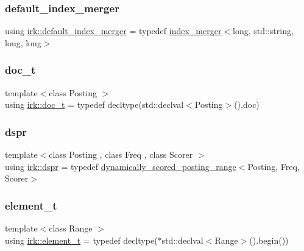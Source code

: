 \subsubsection{\texorpdfstring{default\+\_\+index\+\_\+merger}{default\_index\_merger}}
{\footnotesize\ttfamily using \mbox{\hyperlink{namespaceirk_a227068f98c83d33da43fab6a15633fb5}{irk\+::default\+\_\+index\+\_\+merger}} = typedef \mbox{\hyperlink{classirk_1_1index__merger}{index\+\_\+merger}}$<$long, std\+::string, long, long$>$}

\mbox{\label{namespaceirk_af5d95ec091f3bd711790e71ccb533903}} 
\subsubsection{\texorpdfstring{doc\+\_\+t}{doc\_t}}
{\footnotesize\ttfamily template$<$class Posting $>$ \\
using \mbox{\hyperlink{namespaceirk_af5d95ec091f3bd711790e71ccb533903}{irk\+::doc\+\_\+t}} = typedef decltype(std\+::declval$<$Posting$>$().doc)}

\mbox{\label{namespaceirk_af92c7aae439f59ccae252f027f851c24}} 
\subsubsection{\texorpdfstring{dspr}{dspr}}
{\footnotesize\ttfamily template$<$class Posting , class Freq , class Scorer $>$ \\
using \mbox{\hyperlink{namespaceirk_af92c7aae439f59ccae252f027f851c24}{irk\+::dspr}} = typedef \mbox{\hyperlink{classirk_1_1dynamically__scored__posting__range}{dynamically\+\_\+scored\+\_\+posting\+\_\+range}}$<$Posting, Freq, Scorer$>$}

\mbox{\label{namespaceirk_a44ec708d671914dae1d40355ac05c280}} 
\subsubsection{\texorpdfstring{element\+\_\+t}{element\_t}}
{\footnotesize\ttfamily template$<$class Range $>$ \\
using \mbox{\hyperlink{namespaceirk_a44ec708d671914dae1d40355ac05c280}{irk\+::element\+\_\+t}} = typedef decltype($\ast$std\+::declval$<$Range$>$().begin())}



